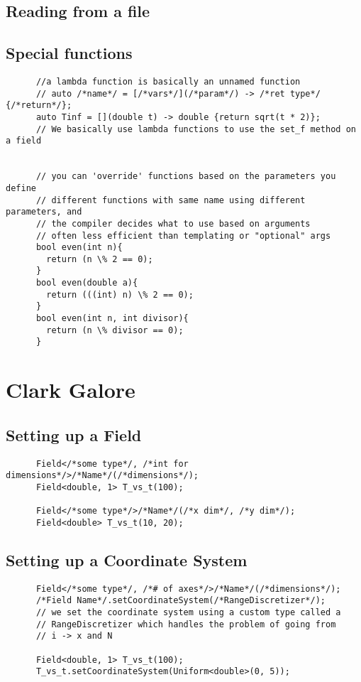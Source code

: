 \documentclass[12pt]{article}
\begin{document}
  \subsection{Reading from a file}
  \subsection{Special functions} %
    \begin{lstlisting}
      //a lambda function is basically an unnamed function
      // auto /*name*/ = [/*vars*/](/*param*/) -> /*ret type*/ {/*return*/};
      auto Tinf = [](double t) -> double {return sqrt(t * 2)};
      // We basically use lambda functions to use the set_f method on a field


      // you can 'override' functions based on the parameters you define
      // different functions with same name using different parameters, and
      // the compiler decides what to use based on arguments
      // often less efficient than templating or "optional" args
      bool even(int n){
        return (n \% 2 == 0);
      }
      bool even(double a){
        return (((int) n) \% 2 == 0);
      }
      bool even(int n, int divisor){
        return (n \% divisor == 0);
      }
    \end{lstlisting}

\section{Clark Galore}
  \subsection{Setting up a Field}
    \begin{lstlisting}
      Field</*some type*/, /*int for dimensions*/>/*Name*/(/*dimensions*/);
      Field<double, 1> T_vs_t(100);

      Field</*some type*/>/*Name*/(/*x dim*/, /*y dim*/);
      Field<double> T_vs_t(10, 20);
    \end{lstlisting}
  \subsection{Setting up a Coordinate System}
    \begin{lstlisting}
      Field</*some type*/, /*# of axes*/>/*Name*/(/*dimensions*/);
      /*Field Name*/.setCoordinateSystem(/*RangeDiscretizer*/);
      // we set the coordinate system using a custom type called a
      // RangeDiscretizer which handles the problem of going from 
      // i -> x and N

      Field<double, 1> T_vs_t(100);
      T_vs_t.setCoordinateSystem(Uniform<double>(0, 5));
    \end{lstlisting}
\end{document}
